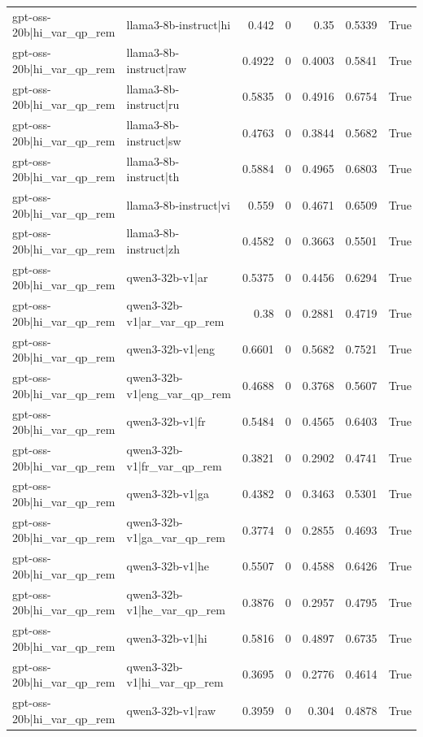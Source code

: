\begin{table}
\begin{tabular}{l l r r r r l}
gpt-oss-20b|hi_var_qp_rem & llama3-8b-instruct|hi & 0.442 & 0 & 0.35 & 0.5339 & True \\
gpt-oss-20b|hi_var_qp_rem & llama3-8b-instruct|raw & 0.4922 & 0 & 0.4003 & 0.5841 & True \\
gpt-oss-20b|hi_var_qp_rem & llama3-8b-instruct|ru & 0.5835 & 0 & 0.4916 & 0.6754 & True \\
gpt-oss-20b|hi_var_qp_rem & llama3-8b-instruct|sw & 0.4763 & 0 & 0.3844 & 0.5682 & True \\
gpt-oss-20b|hi_var_qp_rem & llama3-8b-instruct|th & 0.5884 & 0 & 0.4965 & 0.6803 & True \\
gpt-oss-20b|hi_var_qp_rem & llama3-8b-instruct|vi & 0.559 & 0 & 0.4671 & 0.6509 & True \\
gpt-oss-20b|hi_var_qp_rem & llama3-8b-instruct|zh & 0.4582 & 0 & 0.3663 & 0.5501 & True \\
gpt-oss-20b|hi_var_qp_rem & qwen3-32b-v1|ar & 0.5375 & 0 & 0.4456 & 0.6294 & True \\
gpt-oss-20b|hi_var_qp_rem & qwen3-32b-v1|ar_var_qp_rem & 0.38 & 0 & 0.2881 & 0.4719 & True \\
gpt-oss-20b|hi_var_qp_rem & qwen3-32b-v1|eng & 0.6601 & 0 & 0.5682 & 0.7521 & True \\
gpt-oss-20b|hi_var_qp_rem & qwen3-32b-v1|eng_var_qp_rem & 0.4688 & 0 & 0.3768 & 0.5607 & True \\
gpt-oss-20b|hi_var_qp_rem & qwen3-32b-v1|fr & 0.5484 & 0 & 0.4565 & 0.6403 & True \\
gpt-oss-20b|hi_var_qp_rem & qwen3-32b-v1|fr_var_qp_rem & 0.3821 & 0 & 0.2902 & 0.4741 & True \\
gpt-oss-20b|hi_var_qp_rem & qwen3-32b-v1|ga & 0.4382 & 0 & 0.3463 & 0.5301 & True \\
gpt-oss-20b|hi_var_qp_rem & qwen3-32b-v1|ga_var_qp_rem & 0.3774 & 0 & 0.2855 & 0.4693 & True \\
gpt-oss-20b|hi_var_qp_rem & qwen3-32b-v1|he & 0.5507 & 0 & 0.4588 & 0.6426 & True \\
gpt-oss-20b|hi_var_qp_rem & qwen3-32b-v1|he_var_qp_rem & 0.3876 & 0 & 0.2957 & 0.4795 & True \\
gpt-oss-20b|hi_var_qp_rem & qwen3-32b-v1|hi & 0.5816 & 0 & 0.4897 & 0.6735 & True \\
gpt-oss-20b|hi_var_qp_rem & qwen3-32b-v1|hi_var_qp_rem & 0.3695 & 0 & 0.2776 & 0.4614 & True \\
gpt-oss-20b|hi_var_qp_rem & qwen3-32b-v1|raw & 0.3959 & 0 & 0.304 & 0.4878 & True \\

\end{tabular}
\end{table}
